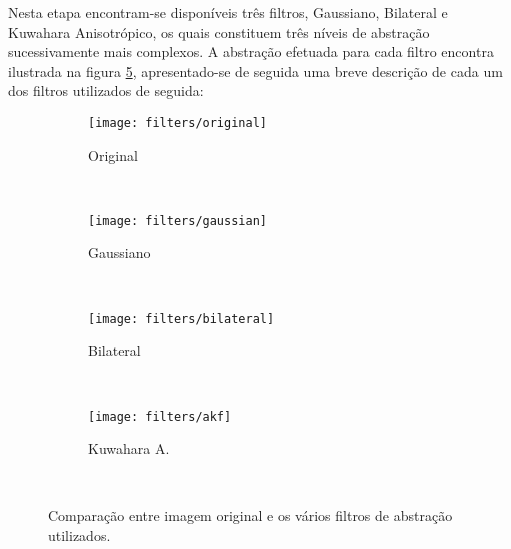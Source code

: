 Nesta etapa encontram-se disponíveis três filtros, Gaussiano, Bilateral e Kuwahara Anisotrópico, os quais constituem três níveis de abstração sucessivamente mais complexos. A abstração efetuada para cada filtro encontra  ilustrada na figura \ref{fig:filters}, apresentado-se de seguida uma breve descrição de cada um dos filtros utilizados de seguida:

\begin{figure}[t]
        \centering
        \begin{subfigure}[b]{0.2\textwidth}
                \centering
                \texttt{[image: filters/original]}
                \caption{Original}
                \label{fig:filters-original}
        \end{subfigure}%
        ~
        \begin{subfigure}[b]{0.2\textwidth}
                \centering
                \texttt{[image: filters/gaussian]}
                \caption{Gaussiano}
                \label{fig:filters-gaussian}
        \end{subfigure}
        ~ 
        \begin{subfigure}[b]{0.2\textwidth}
                \centering
                \texttt{[image: filters/bilateral]}
                \caption{Bilateral}
                \label{fig:filters-bilateral}
        \end{subfigure}
        ~
        \begin{subfigure}[b]{0.2\textwidth}
                \centering
                \texttt{[image: filters/akf]}
                \caption{Kuwahara A.}
                \label{fig:filters-kuwahara}
        \end{subfigure}
        ~ 
        \caption{Comparação entre imagem original e os vários filtros de abstração utilizados.}\label{fig:filters}
\end{figure}

